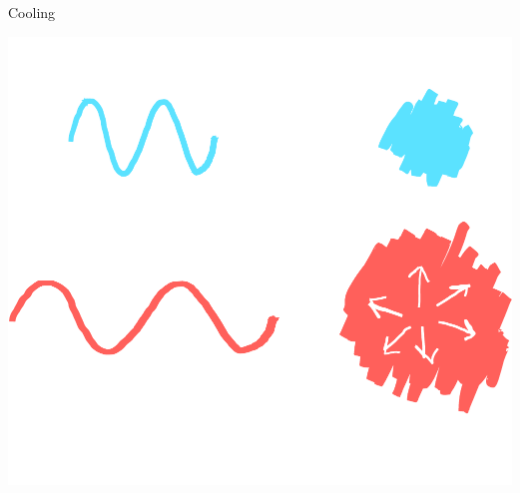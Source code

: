 \documentclass{beamer}
\begin{document}
\begin{frame}{Cooling}
    \begin{center}
        \includegraphics[height=0.6\textheight]{figures/expansion}
    \end{center}
\end{frame}
\end{document}

